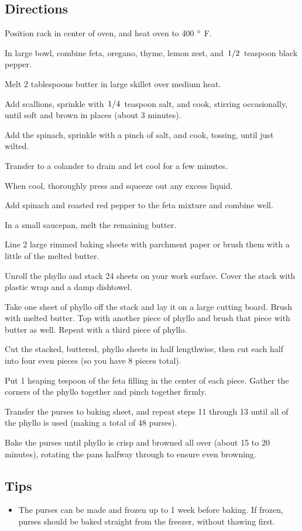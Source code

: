\documentclass{article}
\newcounter{qcounter}
\begin{document}
\subsection*{Directions}
\begin{list}{:~}{}
\item Position rack in center of oven, and heat oven to 400 $^\circ$ F.
\item In large bowl, combine feta, oregano, thyme, lemon zest, and $\left.1\middle/2\right.$ teaspoon black pepper.
\item Melt 2 tablespoons butter in large skillet over medium heat.
\item Add scallions, sprinkle with $\left.1\middle/4\right.$ teaspoon salt, and cook, stirring occasionally, until soft and brown in places (about 3 minutes).
\item Add the spinach, sprinkle with a pinch of salt, and cook, tossing, until just wilted.
\item Transfer to a colander to drain and let cool for a few minutes.
\item When cool, thoroughly press and squeeze out any excess liquid.
\item Add spinach and roasted red pepper to the feta mixture and combine well.
\item In a small saucepan, melt the remaining butter. 
\item Line 2 large rimmed baking sheets with parchment paper or brush them with a little of the melted butter.
\item Unroll the phyllo and stack 24 sheets on your work surface.  Cover the stack with plastic wrap and a damp dishtowel. 
\item Take one sheet of phyllo off the stack and lay it on a large cutting board.  Brush with melted butter.  Top with another piece of phyllo 
and brush that piece with butter as well. Repeat with a third piece of phyllo.
\item Cut the stacked, buttered, phyllo sheets in half lengthwise, then cut each half into four even pieces (so you have 8 pieces total).
\item Put 1 heaping tespoon of the feta filling in the center of each piece.  Gather the corners of the phyllo together and pinch together firmly.
\item Transfer the purses to baking sheet, and repeat steps 11 through 13 until all of the phyllo is used (making a total of 48 purses).
\item Bake the purses until phyllo is crisp and browned all over (about 15 to 20 minutes), rotating the pans halfway through to ensure even browning.
\end{list}

\subsection*{Tips}

\begin{itemize}
\item The purses can be made and frozen up to 1 week before baking.  If frozen, purses should be baked straight from the freezer, without thawing first.
\end{itemize}
\end{document}

